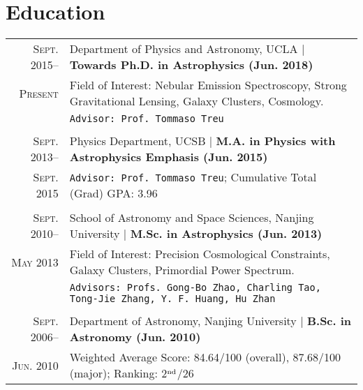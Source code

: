 \documentclass[10pt]{article}
\begin{document}
\section{Education}
\begin{tabular}{r|p{17.5cm}}
  \textsc{Sept. 2015}--      &   Department of Physics and Astronomy, UCLA    |   \textbf{Towards Ph.D. in Astrophysics (Jun. 2018)}   \\
  \textsc{Present}
  & Field of Interest: Nebular Emission Spectroscopy, Strong Gravitational Lensing, Galaxy Clusters, Cosmology.     \\
  &   \texttt{Advisor: Prof. Tommaso Treu}     \\
  \multicolumn{2}{c}{} \\
  \textsc{Sept. 2013}--      &   Physics Department, UCSB    |   \textbf{M.A. in Physics with Astrophysics Emphasis (Jun. 2015)}   \\
  \textsc{Sept. 2015}
  &   \texttt{Advisor: Prof. Tommaso Treu}; \quad Cumulative Total (Grad) GPA: 3.96     \\
  \multicolumn{2}{c}{} \\
  \textsc{Sept. 2010}--     &   School of Astronomy and Space Sciences, Nanjing University  |  \textbf{M.Sc. in Astrophysics (Jun. 2013)}   \\
  \textsc{May 2013}
  & Field of Interest: Precision Cosmological Constraints, Galaxy Clusters, Primordial Power Spectrum. \\
  & \texttt{Advisors: Profs. Gong-Bo Zhao, Charling Tao, Tong-Jie Zhang, Y. F. Huang, Hu Zhan}   \\
  \multicolumn{2}{c}{} \\
  \textsc{Sept. 2006}--     &   Department of Astronomy, Nanjing University  |  \textbf{B.Sc. in Astronomy (Jun. 2010)}    \\
  \textsc{Jun. 2010}       &   Weighted Average Score: 84.64/100 (overall), 87.68/100 (major); Ranking: 2$^{\rm nd}$/26  \\
\end{tabular}

\vspace{1em}
\end{document}
